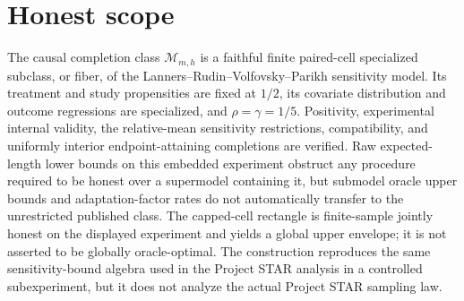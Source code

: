 \documentclass{article}
\begin{document}
\section{Honest scope}

The causal completion class \(\mathcal M_{m,h}\) is a faithful finite paired-cell specialized subclass, or fiber, of the Lanners--Rudin--Volfovsky--Parikh sensitivity model. Its treatment and study propensities are fixed at \(1/2\), its covariate distribution and outcome regressions are specialized, and \(\rho=\gamma=1/5\). Positivity, experimental internal validity, the relative-mean sensitivity restrictions, compatibility, and uniformly interior endpoint-attaining completions are verified. Raw expected-length lower bounds on this embedded experiment obstruct any procedure required to be honest over a supermodel containing it, but submodel oracle upper bounds and adaptation-factor rates do not automatically transfer to the unrestricted published class. The capped-cell rectangle is finite-sample jointly honest on the displayed experiment and yields a global upper envelope; it is not asserted to be globally oracle-optimal. The construction reproduces the same sensitivity-bound algebra used in the Project STAR analysis in a controlled subexperiment, but it does not analyze the actual Project STAR sampling law.
\end{document}
